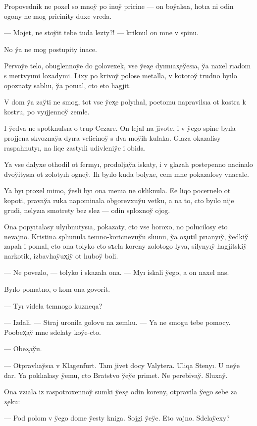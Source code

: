 \documentclass[10pt]{book}
\begin{document}
Propovednik ne poxel so mnoy̆ po inoy̆ pricine — on boy̆alsıa, hotıa ni odin ogony ne mog pricinity duxe vreda.

— Mojet, ne stoy̆it tebe tuda lezty?! — kriknul on mne v spinu.

No y̆a ne mog postupity inace.

Pervoy̆e telo, obuglennoy̆e do golovexek, vse y̆ex̨e dyımıax̨ey̆esıa, y̆a naxel rıadom s mertvyımi loxadymi. Lixy po krivoy̆ polose metalla, v kotoroy̆ trudno byılo opoznaty sablıu, y̆a ponıal, cto eto hagjit.

V dom y̆a zay̆ti ne smog, tot vse y̆ex̨e polyıhal, poetomu napravilsıa ot kostra k kostru, po vyıjjennoy̆ zemle.

I y̆edva ne spotknulsıa o trup Cezare. On lejal na jivote, i v y̆ego spine byıla projjena skvoznay̆a dyıra velicinoy̆ s dva moy̆ih kulaka. Glaza okazalisy raspahnutyı, na liqe zastyıli udivleniy̆e i obida.

Ya vse dalyxe othodil ot fermyı, prodoljay̆a iskaty, i v glazah postepenno nacinalo dvoy̆itysıa ot zolotyıh ogney̆. Ih byılo kuda bolyxe, cem mne pokazalosy vnacale.

Ya byı proxel mimo, y̆esli byı ona menıa ne okliknula. Ee liqo pocernelo ot kopoti, pravay̆a ruka napominala obgorevxuy̆u vetku, a na to, cto byılo nije grudi, nelyzıa smotrety bez slez — odin sploxnoy̆ ojog.

Ona popyıtalasy ulyıbnutysıa, pokazaty, cto vse horoxo, no polucilosy eto nevajno. Kristina splıunula temno-koricnevuy̆u slıunu, y̆a ox̨util prıanyıy̆, y̆edkiy̆ zapah i ponıal, cto ona tolyko cto sъela koreny zolotogo lyva, silynyıy̆ hagjitskiy̆ narkotik, izbavlıay̆ux̨iy̆ ot lıuboy̆ boli.

— Ne povezlo, — tolyko i skazala ona. — Myı iskali y̆ego, a on naxel nas.

Byılo ponıatno, o kom ona govorit.

— Tyı videla temnogo kuzneqa?

— Izdali. — Straj uronila golovu na zemlıu. — Ya ne smogu tebe pomocy. Poobex̨ay̆ mne sdelaty koy̆e-cto.

— Obex̨ay̆u.

— Otpravlıay̆sıa v Klagenfurt. Tam jivet docy Valytera. Uliqa Stenyı. U ney̆e dar. Ya poklıalasy y̆emu, cto Bratstvo y̆ey̆e primet. Ne perebivay̆. Sluxay̆.

Ona vzıala iz raspotroxennoy̆ sumki y̆ex̨e odin koreny, otpravila y̆ego sebe za x̨eku:

— Pod polom v y̆ego dome y̆esty kniga. Sojgi y̆ey̆e. Eto vajno. Sdelay̆exy?
\end{document}
